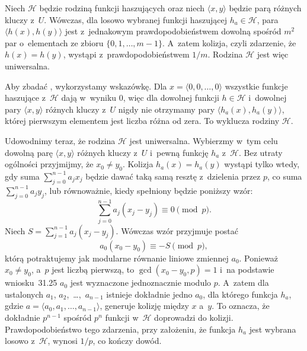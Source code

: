\bigskip
{}

\subproblem %
Niech $\mathcal{H}$ będzie  rodziną funkcji haszujących oraz niech $\langle x,y\rangle$ będzie parą różnych kluczy z~$U$. Wówczas, dla losowo wybranej funkcji haszującej $h_a\in\mathcal{H}$, para $\langle h(x),h(y)\rangle$ jest z~jednakowym prawdopodobieństwem dowolną spośród $m^2$ par o~elementach ze zbioru $\{0,1,\dots,m-1\}$. A~zatem kolizja, czyli zdarzenie, że $h(x)=h(y)$, wystąpi z~prawdopodobieństwem $1/m$. Rodzina $\mathcal{H}$ jest więc uniwersalna.

\subproblem %
Aby zbadać , wykorzystamy wskazówkę. Dla $x=\langle0,0,\dots,0\rangle$ wszystkie funkcje haszujące z~$\mathcal{H}$ dają w~wyniku 0, więc dla dowolnej funkcji $h\in\mathcal{H}$ i~dowolnej pary $\langle x,y\rangle$ różnych kluczy z~$U$ nigdy nie otrzymamy pary $\langle h_a(x),h_a(y)\rangle$, której pierwszym elementem jest liczba różna od zera. To wyklucza  rodziny $\mathcal{H}$.

Udowodnimy teraz, że rodzina $\mathcal{H}$ jest uniwersalna. Wybierzmy w~tym celu dowolną parę $\langle x,y\rangle$ różnych kluczy z~$U$ i~pewną funkcję $h_a$ z~$\mathcal{H}$. Bez utraty ogólności przyjmijmy, że $x_0\ne y_0$. Kolizja $h_a(x)=h_a(y)$ wystąpi tylko wtedy, gdy suma $\sum_{j=0}^{n-1}a_jx_j$ będzie dawać taką samą resztę z~dzielenia przez $p$, co suma $\sum_{j=0}^{n-1}a_jy_j$, lub równoważnie, kiedy spełniony będzie poniższy wzór:
\[
	\sum_{j=0}^{n-1}a_j(x_j-y_j) \equiv 0 \pmod p.
\]
Niech $S=\sum_{j=1}^{n-1}a_j(x_j-y_j)$. Wówczas wzór przyjmuje postać
\[
	a_0(x_0-y_0) \equiv -S \pmod p,
\]
którą potraktujemy jak modularne równanie liniowe zmiennej $a_0$. Ponieważ $x_0\ne y_0$, a~$p$ jest liczbą pierwszą, to $\gcd(x_0-y_0,p)=1$ i~na podstawie wniosku~31.25 $a_0$ jest wyznaczone jednoznacznie modulo $p$. A~zatem dla ustalonych $a_1$, $a_2$,~\dots,~$a_{n-1}$ istnieje dokładnie jedno $a_0$, dla którego funkcja $h_a$, gdzie $a=\langle a_0,a_1,\dots,a_{n-1}\rangle$, generuje kolizję między $x$ a~$y$. To oznacza, że dokładnie $p^{n-1}$ spośród $p^n$ funkcji w~$\mathcal{H}$ doprowadzi do kolizji. Prawdopodobieństwo tego zdarzenia, przy założeniu, że funkcja $h_a$ jest wybrana losowo z~$\mathcal{H}$, wynosi $1/p$, co kończy dowód.

